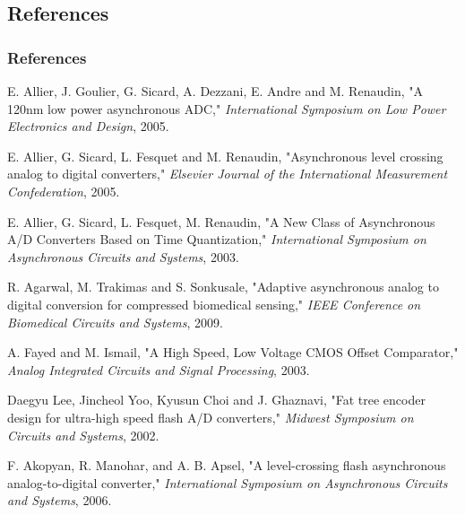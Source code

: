 \documentclass{beamer}
\begin{document}
\subsection*{References}
\begin{frame}
	\frametitle{References}
	\begin{thebibliography}{12}
	\tiny { 	 E. Allier, J. Goulier, G. Sicard, A. Dezzani, E. Andre and M. Renaudin, "A 120nm low power asynchronous ADC,"
 				\emph {International Symposium on Low Power Electronics and Design}, 2005.

				 E. Allier, G. Sicard, L. Fesquet and M. Renaudin, "Asynchronous level crossing analog to digital converters," 
				\emph {Elsevier Journal of the International Measurement Confederation}, 2005.

				 E. Allier, G. Sicard, L. Fesquet, M. Renaudin,  "A New Class of Asynchronous A/D Converters Based on Time Quantization," 
				\emph {International Symposium on Asynchronous Circuits and Systems}, 2003.

				 R. Agarwal, M. Trakimas and S. Sonkusale, "Adaptive asynchronous analog to digital conversion for compressed biomedical sensing,"
				\emph {IEEE Conference on Biomedical Circuits and Systems}, 2009.

				 A. Fayed and M. Ismail, "A High Speed, Low Voltage CMOS Offset Comparator," 
				\emph {Analog Integrated Circuits and Signal Processing}, 2003.

				 Daegyu Lee, Jincheol Yoo, Kyusun Choi and J. Ghaznavi, "Fat tree encoder design for ultra-high speed flash A/D converters,"
				\emph { Midwest Symposium on Circuits and Systems}, 2002.

				 F. Akopyan, R. Manohar, and A. B. Apsel, "A level-crossing flash asynchronous analog-to-digital converter," 
				\emph {International Symposium on Asynchronous Circuits and Systems}, 2006. }
	\end{thebibliography}
\end{frame}
\end{document}
